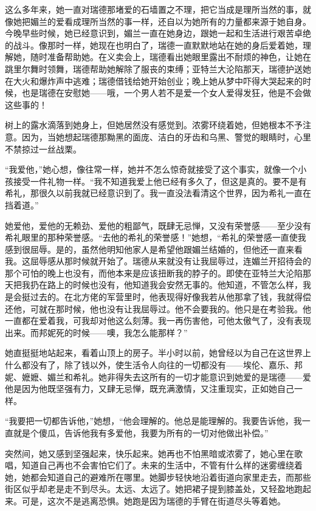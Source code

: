 \par 这么多年来，她一直对瑞德那堵爱的石墙置之不理，把它当成是理所当然的事，就像她把媚兰的爱看成理所当然的事一样，还自以为她所有的力量都来源于她自身。今晚早些时候，她已经意识到，媚兰一直在她身边，跟她一起和生活进行艰苦卓绝的战斗。像那时一样，她现在也明白了，瑞德一直默默地站在她的身后爱着她，理解她，随时准备帮助她。在义卖会上，瑞德看出她眼里露出不耐烦的神色，让她在跳里尔舞时领舞，瑞德帮助她解除了服丧的束缚；亚特兰大沦陷那天，瑞德护送她在大火和爆炸声中逃难；瑞德借钱给她开始创业；晚上她从梦中吓得大哭起来的时候，也是瑞德在安慰她——哦，一个男人若不是爱一个女人爱得发狂，他是不会做这些事的！
\par 树上的露水滴落到她身上，但她居然没有感觉到。浓雾环绕着她，但她根本不予注意。因为，当她想起瑞德那黝黑的面庞、洁白的牙齿和乌黑、警觉的眼睛时，心里不禁掠过一丝战栗。
\par “我爱他，”她心想，像往常一样，她并不怎么惊奇就接受了这个事实，就像一个小孩接受一件礼物一样。“我不知道我爱上他已经有多久了，但这是真的。要不是有希礼，那很久以前我就已经意识到了。我一直没法看清这个世界，因为希礼一直在挡着道。”
\par 她爱他，爱他的无赖劲、爱他的粗鄙气，既肆无忌惮，又没有荣誉感——至少没有希礼眼里的那种荣誉感。“去他的希礼的荣誉感！”她想，“希礼的荣誉感一直使我感到很屈辱。是的，虽然他明知他家人是希望他跟媚兰结婚的，但他还一直来看我。这屈辱感从那时候就开始了。瑞德从来就没有让我屈辱过，连媚兰开招待会的那个可怕的晚上也没有，而他本来是应该扭断我的脖子的。即使在亚特兰大沦陷那天把我扔在路上的时候也没有，他知道我会安然无事的。他知道，不管怎么样，我是会挺过去的。在北方佬的军营里时，他表现得好像我若从他那拿了钱，我就得偿还他，可就在那时候，他也没有让我屈辱过。他不会要我的。他只是在考验我。他一直都在爱着我，可我却对他这么刻薄。我一再伤害他，可他太傲气了，没有表现出来。而邦妮死的时候——噢，我怎么能那样？”
\par 她直挺挺地站起来，看着山顶上的房子。半小时以前，她曾经以为自己在这世界上什么都没有了，除了钱以外，使生活令人向往的一切都没有——埃伦、嘉乐、邦妮、嬷嬷、媚兰和希礼。她非得失去这所有的一切才能意识到她爱的是瑞德——爱他是因为他既坚强有力，又肆无忌惮，既充满激情，又注重现实，正如她自己一样。
\par “我要把一切都告诉他，”她想，“他会理解的。他总是能理解的。我要告诉他，我一直就是个傻瓜，告诉他我有多爱他，我要为所有的一切对他做出补偿。”
\par 突然间，她又感到坚强起来，快乐起来。她再也不怕黑暗或浓雾了，她心里在歌唱，知道自己再也不会害怕它们了。未来的生活中，不管有什么样的迷雾缠绕着她，她都会知道自己的避难所在哪里。她脚步轻快地沿着街道向家里走去，而那些街区似乎却老是走不到尽头。太远、太远了。她把裙子提到膝盖处，又轻盈地跑起来。可是，这次不是逃离恐惧。她跑是因为瑞德的手臂在街道尽头等着她。

